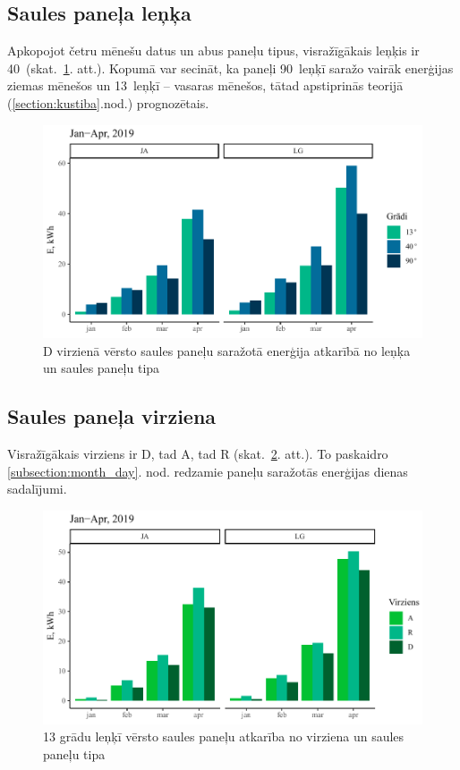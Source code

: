 \subsection{Saules paneļa leņķa}\label{subsection:degree}
Apkopojot četru mēnešu datus un abus paneļu tipus, visražīgākais leņķis ir 40\textdegree ~(skat.~\ref{fig:lg_ja_deg}. att.).
Kopumā var secināt, ka paneļi 90\textdegree ~leņķī saražo vairāk enerģijas ziemas mēnešos un 13\textdegree ~leņķī -- vasaras mēnešos, tātad apstiprinās teorijā (\ref{section:kustiba}.nod.) prognozētais.
\begin{figure}[h!]
    \centering
    \includegraphics[width=\linewidth]{figures/results/all_degType.pdf}
    \caption{D virzienā vērsto saules paneļu saražotā enerģija atkarībā no leņķa un saules paneļu tipa} \label{fig:lg_ja_deg}
\end{figure}


\subsection{Saules paneļa virziena}\label{subsection:dir}
Visražīgākais virziens ir D, tad A, tad R (skat.~\ref{fig:lg_ja_dir}. att.). To paskaidro \ref{subsection:month_day}. nod. redzamie paneļu saražotās enerģijas dienas sadalījumi.
\begin{figure}[h!]
    \centering
    \includegraphics[width=\linewidth]{figures/results/all_dirType.pdf}
    \caption{13 grādu leņķī vērsto saules paneļu atkarība no virziena un saules paneļu tipa}
    \label{fig:lg_ja_dir}
\end{figure}

